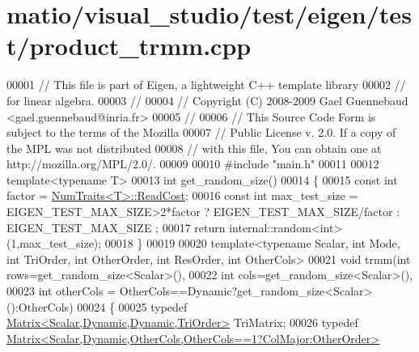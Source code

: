 \hypertarget{matio_2visual__studio_2test_2eigen_2test_2product__trmm_8cpp_source}{}\section{matio/visual\+\_\+studio/test/eigen/test/product\+\_\+trmm.cpp}
\label{matio_2visual__studio_2test_2eigen_2test_2product__trmm_8cpp_source}

\begin{DoxyCode}
00001 \textcolor{comment}{// This file is part of Eigen, a lightweight C++ template library}
00002 \textcolor{comment}{// for linear algebra.}
00003 \textcolor{comment}{//}
00004 \textcolor{comment}{// Copyright (C) 2008-2009 Gael Guennebaud <gael.guennebaud@inria.fr>}
00005 \textcolor{comment}{//}
00006 \textcolor{comment}{// This Source Code Form is subject to the terms of the Mozilla}
00007 \textcolor{comment}{// Public License v. 2.0. If a copy of the MPL was not distributed}
00008 \textcolor{comment}{// with this file, You can obtain one at http://mozilla.org/MPL/2.0/.}
00009 
00010 \textcolor{preprocessor}{#include "main.h"}
00011 
00012 \textcolor{keyword}{template}<\textcolor{keyword}{typename} T>
00013 \textcolor{keywordtype}{int} get\_random\_size()
00014 \{
00015   \textcolor{keyword}{const} \textcolor{keywordtype}{int} factor = \hyperlink{group___core___module_struct_eigen_1_1_num_traits}{NumTraits<T>::ReadCost};
00016   \textcolor{keyword}{const} \textcolor{keywordtype}{int} max\_test\_size = EIGEN\_TEST\_MAX\_SIZE>2*factor ? EIGEN\_TEST\_MAX\_SIZE/factor : EIGEN\_TEST\_MAX\_SIZE
      ;
00017   \textcolor{keywordflow}{return} internal::random<int>(1,max\_test\_size);
00018 \}
00019 
00020 \textcolor{keyword}{template}<\textcolor{keyword}{typename} Scalar, \textcolor{keywordtype}{int} Mode, \textcolor{keywordtype}{int} TriOrder, \textcolor{keywordtype}{int} OtherOrder, \textcolor{keywordtype}{int} ResOrder, \textcolor{keywordtype}{int} OtherCols>
00021 \textcolor{keywordtype}{void} trmm(\textcolor{keywordtype}{int} rows=get\_random\_size<Scalar>(),
00022           \textcolor{keywordtype}{int} cols=get\_random\_size<Scalar>(),
00023           \textcolor{keywordtype}{int} otherCols = OtherCols==Dynamic?get\_random\_size<Scalar>():OtherCols)
00024 \{
00025   \textcolor{keyword}{typedef} \hyperlink{group___core___module_class_eigen_1_1_matrix}{Matrix<Scalar,Dynamic,Dynamic,TriOrder>} TriMatrix;
00026   \textcolor{keyword}{typedef} \hyperlink{group___core___module_class_eigen_1_1_matrix}{Matrix<Scalar,Dynamic,OtherCols,OtherCols==1?ColMajor:OtherOrder>}

\end{DoxyCode}
